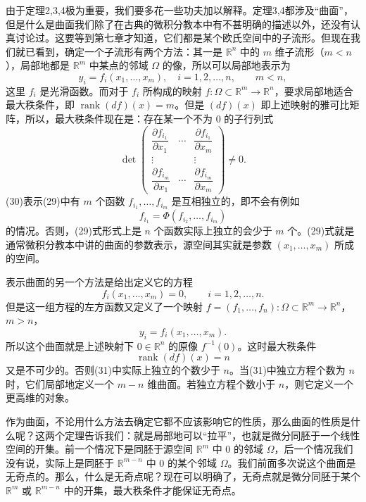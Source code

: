 由于定理2,3,4极为重要，我们要多花一些功夫加以解释。定理3,4都涉及“曲面”，但是什么是曲面我们除了在古典的微积分教本中有不甚明确的描述以外，还没有认真讨论过。这要等到第七章才知道，它们都是某个欧氏空间中的子流形。但现在我们就已看到，确定一个子流形有两个方法：其一是 $\mathbb R^n$ 中的 $m$ 维子流形（$m<n$），局部地都是 $\mathbb R^m$ 中某点的邻域 $\Omega$ 的像，所以可以局部地表示为
\begin{equation}
 y_i=f_i(x_1,\ldots,x_m),\quad i=1,2,\ldots,n,
 \qquad m<n,
 \tag{29}
\end{equation}
这里 $f_i$ 是光滑函数。而对于 $f_i$ 所构成的映射 $f:\Omega\subset\mathbb R^m\to\mathbb R^n$，要求局部地适合最大秩条件，即 $\operatorname{rank}(df)(x)=m$。但是 $(df)(x)$ 即上述映射的雅可比矩阵，所以，最大秩条件现在是：存在某一个不为 $0$ 的子行列式
\begin{equation}
 \det
 \begin{pmatrix}
  \dfrac{\partial f_{i_1}}{\partial x_1}&\cdots&\dfrac{\partial f_{i_1}}{\partial x_m}\\
  \vdots&&\vdots\\
  \dfrac{\partial f_{i_m}}{\partial x_1}&\cdots&\dfrac{\partial f_{i_m}}{\partial x_m}
 \end{pmatrix}\ne0.
 \tag{30}
\end{equation}
(30)表示(29)中有 $m$ 个函数 $f_{i_1},\ldots,f_{i_m}$ 是互相独立的，即不会有例如
\[
 f_{i_1}=\Phi(f_{i_2},\ldots,f_{i_m})
\]
的情况。否则，(29)式形式上是 $n$ 个函数实际上独立的会少于 $m$ 个。(29)式就是通常微积分教本中讲的曲面的参数表示，源空间其实就是参数 $(x_1,\ldots,x_m)$ 所成的空间。

表示曲面的另一个方法是给出定义它的方程
\begin{equation}
 f_i(x_1,\ldots,x_m)=0,
 \qquad i=1,2,\ldots,n.
 \tag{31}
\end{equation}
但是这一组方程的左方函数又定义了一个映射 $f=(f_1,\ldots,f_n):\Omega\subset\mathbb R^m\to\mathbb R^n$，$m>n$，
\[
 y_i=f_i(x_1,\ldots,x_m).
\]
所以这个曲面就是上述映射下 $0\in\mathbb R^n$ 的原像 $f^{-1}(0)$。这时最大秩条件\[\operatorname{rank}(df)(x)=n\]又是不可少的。否则(31)中实际上独立的个数少于 $n$。当(31)中独立方程个数为 $n$ 时，它们局部地定义一个 $m-n$ 维曲面。若独立方程个数小于 $n$，则它定义一个更高维的对象。

作为曲面，不论用什么方法去确定它都不应该影响它的性质，那么曲面的性质是什么呢？这两个定理告诉我们：就是局部地可以“拉平”，也就是微分同胚于一个线性空间的开集。前一个情况下是同胚于源空间 $\mathbb R^m$ 中 $0$ 的邻域 $\Omega$，后一个情况我们没有说，实际上是同胚于 $\mathbb R^{m-n}$ 中 $0$ 的某个邻域 $\Omega$。我们前面多次说这个曲面是无奇点的。那么，什么是无奇点呢？现在可以明确了，无奇点就是微分同胚于某个 $\mathbb R^m$ 或 $\mathbb R^{m-n}$ 中的开集，最大秩条件才能保证无奇点。

